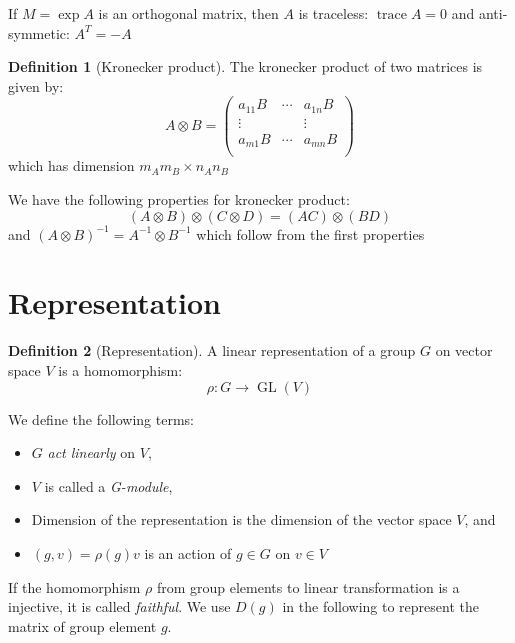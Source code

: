 \documentclass{amsart}
\theoremstyle{remark}
\theoremstyle{remark}
\theoremstyle{definition}
\newtheorem*{definition}{Definition}
\DeclareMathOperator{\GL}{GL}
\DeclareMathOperator{\Tr}{trace}
\begin{document}
If $M = \exp A$ is an orthogonal matrix, then $A$ is traceless: $\Tr A = 0$ and 
anti-symmetic: $A^T = -A$

\vspace{10pt}

\begin{definition}
    [Kronecker product]
    The kronecker product of two matrices is given by:
    \begin{equation*}
        A \otimes B = \left( \begin{matrix}
            a_{11}B & \cdots & a_{1n}B \\
            \vdots &   & \vdots \\
            a_{m1}B & \cdots & a_{mn}B \\
        \end{matrix} \right)
    \end{equation*}
    which has dimension $m_Am_B\times n_An_B$
\end{definition}

We have the following properties for kronecker product:
\begin{equation*}
    (A\otimes B) \otimes (C \otimes D) = (AC) \otimes (BD)
\end{equation*}
and $(A\otimes B)^{-1} = A^{-1} \otimes B^{-1}$
which follow from the first properties

\section*{Representation}

\begin{definition}
    [Representation]
    A linear representation of a group $G$ on vector space $V$ is a homomorphism:
    \[\rho\colon G\to \GL(V)\]
\end{definition}
We define the following terms:
\begin{itemize}
    \item $G$ \emph{act linearly} on $V$,
    \item $V$ is called a \emph{G-module},
    \item Dimension of the representation is the dimension of the vector space $V$, and
    \item $(g,v)=\rho(g)v$ is an action of $g\in G$ on $v\in V$ 
\end{itemize}
If the homomorphism $\rho$ from group elements to linear transformation is a injective, 
it is called \emph{faithful}. We use $D(g)$ in the following to represent the matrix 
of group element $g$.
\end{document}
